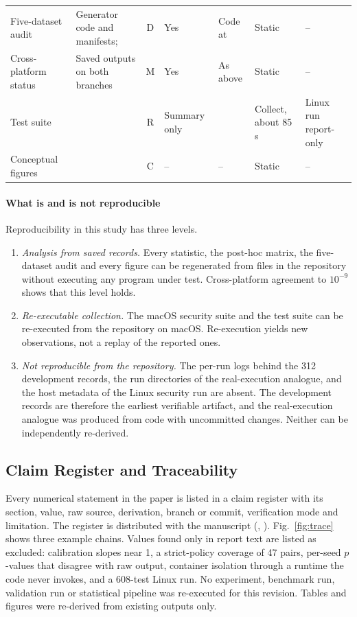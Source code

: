 \begin{table}[!t]
\begin{tabular}{|L{2.6cm}|L{4.4cm}|c|L{1.0cm}|L{1.25cm}|L{1.45cm}|L{3.3cm}|}
Five-dataset audit & Generator code and manifests;  & D & Yes & Code at  & Static & -- \\
Cross-platform status & Saved outputs on both branches & M & Yes & As above & Static & -- \\
Test suite &  & R & Summary only &  & Collect, about 85\,s & Linux run report-only \\
Conceptual figures &  & C & -- & -- & Static & -- \\
\hline
\end{tabular}
\end{table}

\paragraph*{What is and is not reproducible} Reproducibility in this study has three levels.
\begin{enumerate}
\item \emph{Analysis from saved records.} Every statistic, the post-hoc \ers{} matrix, the five-dataset audit and every figure can be regenerated from files in the repository without executing any program under test. Cross-platform agreement to $10^{-9}$ shows that this level holds.
\item \emph{Re-executable collection.} The macOS security suite and the test suite can be re-executed from the repository on macOS. Re-execution yields new observations, not a replay of the reported ones.
\item \emph{Not reproducible from the repository.} The per-run logs behind the 312 development records, the run directories of the real-execution analogue, and the host metadata of the Linux security run are absent. The development records are therefore the earliest verifiable artifact, and the real-execution analogue was produced from code with uncommitted changes. Neither can be independently re-derived.
\end{enumerate}

\subsection{Claim Register and Traceability}
Every numerical statement in the paper is listed in a claim register with its section, value, raw source, derivation, branch or commit, verification mode and limitation. The register is distributed with the manuscript (, ). Fig.~\ref{fig:trace} shows three example chains. Values found only in report text are listed as excluded: calibration slopes near 1, a strict-policy coverage of 47 pairs, per-seed $p$-values that disagree with raw output, container isolation through a runtime the code never invokes, and a 608-test Linux run. No experiment, benchmark run, validation run or statistical pipeline was re-executed for this revision. Tables and figures were re-derived from existing outputs only.

